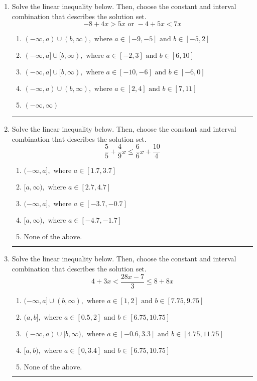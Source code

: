 \documentclass[14pt]{extbook}
\newcommand{\litem}[1]{\item#1\hspace*{-1cm}\rule{\textwidth}{0.4pt}}
\begin{document}
\begin{enumerate}
{\begin{enumerate}[label=\Alph*.]
\end{enumerate} }
\litem{
Solve the linear inequality below. Then, choose the constant and interval combination that describes the solution set.\[ -8 + 4 x > 5 x \text{ or } -4 + 5 x < 7 x \]\begin{enumerate}[label=\Alph*.]
\item \( (-\infty, a) \cup (b, \infty), \text{ where } a \in [-9, -5] \text{ and } b \in [-5, 2] \)
\item \( (-\infty, a] \cup [b, \infty), \text{ where } a \in [-2, 3] \text{ and } b \in [6, 10] \)
\item \( (-\infty, a] \cup [b, \infty), \text{ where } a \in [-10, -6] \text{ and } b \in [-6, 0] \)
\item \( (-\infty, a) \cup (b, \infty), \text{ where } a \in [2, 4] \text{ and } b \in [7, 11] \)
\item \( (-\infty, \infty) \)

\end{enumerate} }
\litem{
Solve the linear inequality below. Then, choose the constant and interval combination that describes the solution set.\[ \frac{5}{5} + \frac{4}{9} x \leq \frac{6}{6} x + \frac{10}{4} \]\begin{enumerate}[label=\Alph*.]
\item \( (-\infty, a], \text{ where } a \in [1.7, 3.7] \)
\item \( [a, \infty), \text{ where } a \in [2.7, 4.7] \)
\item \( (-\infty, a], \text{ where } a \in [-3.7, -0.7] \)
\item \( [a, \infty), \text{ where } a \in [-4.7, -1.7] \)
\item \( \text{None of the above}. \)

\end{enumerate} }
\litem{
Solve the linear inequality below. Then, choose the constant and interval combination that describes the solution set.\[ 4 + 3 x < \frac{28 x - 7}{3} \leq 8 + 8 x \]\begin{enumerate}[label=\Alph*.]
\item \( (-\infty, a] \cup (b, \infty), \text{ where } a \in [1, 2] \text{ and } b \in [7.75, 9.75] \)
\item \( (a, b], \text{ where } a \in [0.5, 2] \text{ and } b \in [6.75, 10.75] \)
\item \( (-\infty, a) \cup [b, \infty), \text{ where } a \in [-0.6, 3.3] \text{ and } b \in [4.75, 11.75] \)
\item \( [a, b), \text{ where } a \in [0, 3.4] \text{ and } b \in [6.75, 10.75] \)
\item \( \text{None of the above.} \)


\end{enumerate}}
\end{enumerate}
\end{document}
